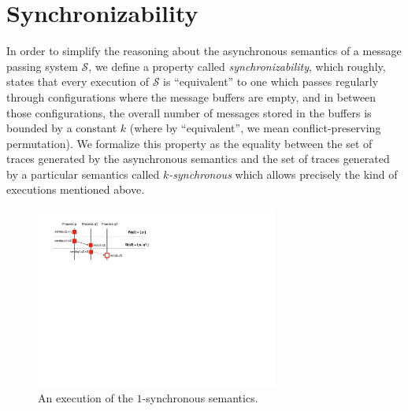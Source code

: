 \section{Synchronizability}\label{sec:criterion}

In order to simplify the reasoning about the asynchronous semantics of a message passing system $\mathcal{S}$, we define a property called \emph{synchronizability}, which roughly, states that every execution of $\mathcal{S}$ is ``equivalent'' to one which passes regularly through configurations where the message buffers are empty, and in between those configurations, the overall number of messages stored in the buffers is bounded by a constant $k$ (where by ``equivalent'', we mean conflict-preserving permutation). We formalize this property as the equality between the set of traces generated by the asynchronous semantics and the set of traces generated by a particular semantics called \emph{$k$-synchronous} which allows precisely the kind of executions mentioned above.

\begin{figure}[t]
\includegraphics[width=8cm]{ex-blocking.pdf}
\caption{An execution of the $1$-synchronous semantics.}
\label{fig:ex-blocking}
\end{figure}

